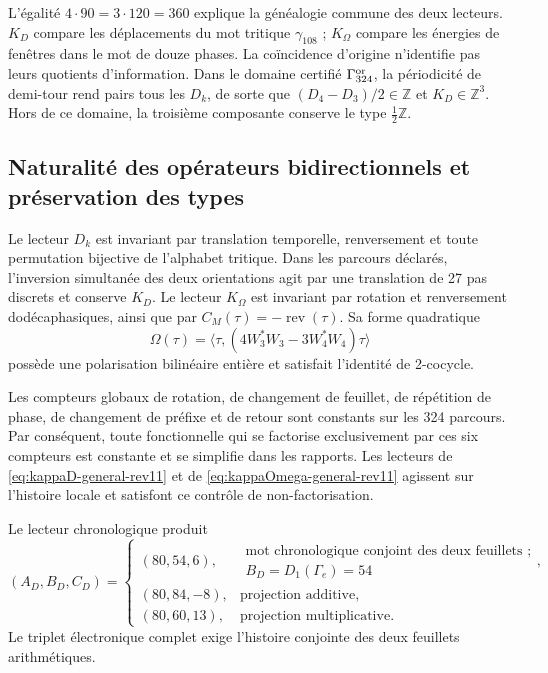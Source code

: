L'égalité \(4\cdot90=3\cdot120=360\) explique la généalogie commune des
deux lecteurs. \(K_D\) compare les déplacements du mot tritique
\(\gamma_{108}\) ;
\(K_\Omega\) compare les énergies de fenêtres dans le mot de douze phases. La
coïncidence d'origine n'identifie pas leurs quotients d'information.
Dans le domaine certifié \(\Gamma_{324}^{\rm or}\), la périodicité de
demi-tour rend pairs tous les \(D_k\), de sorte que
\((D_4-D_3)/2\in\mathbb Z\) et \(K_D\in\mathbb Z^3\). Hors de ce domaine,
la troisième composante conserve le type \(\tfrac12\mathbb Z\).

\subsection{Naturalité des opérateurs bidirectionnels et préservation des types}

Le lecteur \(D_k\) est invariant par translation temporelle, renversement et toute
permutation bijective de l'alphabet tritique. Dans les parcours déclarés,
l'inversion simultanée des deux orientations agit par une translation de
27 pas discrets et conserve \(K_D\). Le lecteur \(K_\Omega\) est invariant par
rotation et renversement dodécaphasiques, ainsi que par
\(C_M(\tau)=-\operatorname{rev}(\tau)\). Sa forme quadratique
\[
 \Omega(\tau)=\langle\tau,
 (4W_3^*W_3-3W_4^*W_4)\tau\rangle
\]
possède une polarisation bilinéaire entière et satisfait l'identité de 2-cocycle.

Les compteurs globaux de rotation, de changement de feuillet, de répétition de phase, de changement de
préfixe et de retour sont constants sur les 324 parcours. Par conséquent, toute
fonctionnelle qui se factorise exclusivement par ces six compteurs est constante
et se simplifie dans les rapports. Les lecteurs de
\eqref{eq:kappaD-general-rev11} et de
\eqref{eq:kappaOmega-general-rev11} agissent sur l'histoire locale et satisfont
ce contrôle de non-factorisation.

\begin{ablation}
\label{abl:hojas-lector-two-way-rev11}
Le lecteur chronologique produit
\[
 (A_D,B_D,C_D)=
 \begin{cases}
 (80,54,6),&\substack{\text{mot chronologique conjoint des deux feuillets ;}\\
 B_D=D_1(\Gamma_e)=54},\\
 (80,84,-8),&\text{projection additive},\\
 (80,60,13),&\text{projection multiplicative}.
 \end{cases}
\]
Le triplet électronique complet exige l'histoire conjointe des deux feuillets
arithmétiques.
\end{ablation}

